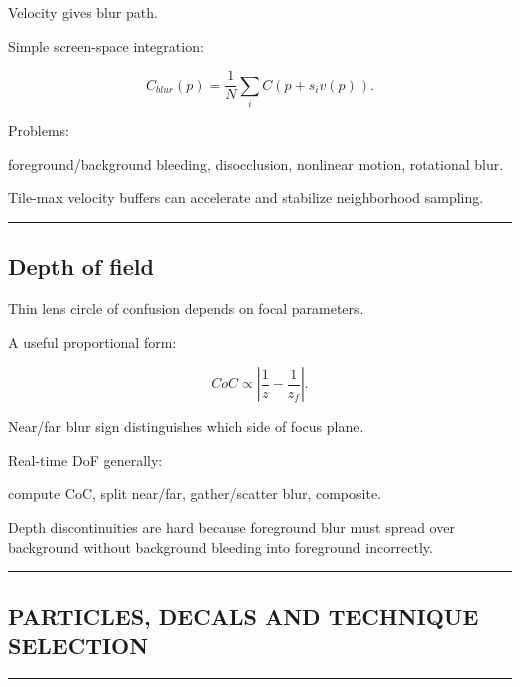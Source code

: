 \hypertarget{04-visual-computing-ii-ch040-motion-blur}{}

Velocity gives blur path.

Simple screen-space integration:

\[
C_{blur}(p)
=
\frac1N
\sum_i
C(
p+s_iv(p)
).
\]

Problems:

foreground/background bleeding, disocclusion, nonlinear motion, rotational blur.

Tile-max velocity buffers can accelerate and stabilize neighborhood sampling.

\begin{center}\rule{0.5\linewidth}{0.5pt}\end{center}

\subsection{Depth of field}\label{04-visual-computing-ii-ch040-depth-of-field}

\hypertarget{04-visual-computing-ii-ch040-depth-of-field}{}

Thin lens circle of confusion depends on focal parameters.

A useful proportional form:

\[
CoC
\propto
\left|
\frac1z-
\frac1{z_f}
\right|.
\]

Near/far blur sign distinguishes which side of focus plane.

Real-time DoF generally:

compute CoC, split near/far, gather/scatter blur, composite.

Depth discontinuities are hard because foreground blur must spread over background without background bleeding into foreground incorrectly.

\begin{center}\rule{0.5\linewidth}{0.5pt}\end{center}

\subsection{PARTICLES, DECALS AND TECHNIQUE SELECTION}\label{04-visual-computing-ii-ch040-particles-decals-and-technique-selection}

\hypertarget{04-visual-computing-ii-ch040-particles-decals-and-technique-selection}{}

\begin{center}\rule{0.5\linewidth}{0.5pt}\end{center}

